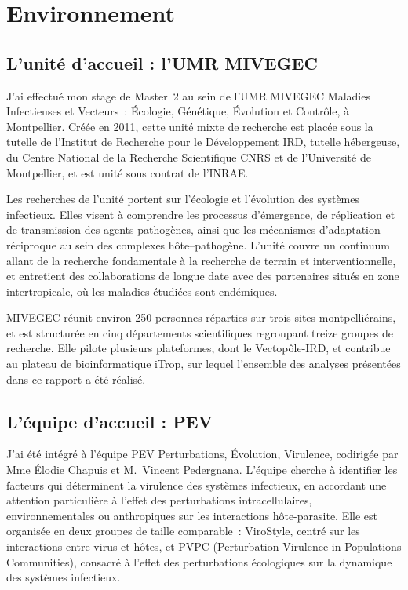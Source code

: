 \documentclass[11pt,a4paper]{article}
\begin{document}
\newpage
\tableofcontents

\newpage




\section{Environnement}

\subsection{L'unité d'accueil : l'UMR MIVEGEC}

J'ai effectué mon stage de Master~2 au sein de l'UMR MIVEGEC Maladies Infectieuses et
Vecteurs~: Écologie, Génétique, Évolution et Contrôle, à Montpellier. Créée en 2011, cette unité
mixte de recherche est placée sous la tutelle de l'Institut de Recherche pour le Développement
IRD, tutelle hébergeuse, du Centre National de la Recherche Scientifique CNRS et de
l'Université de Montpellier, et est unité sous contrat de l'INRAE.

Les recherches de l'unité portent sur l'écologie et l'évolution des systèmes infectieux. Elles
visent à comprendre les processus d'émergence, de réplication et de transmission des agents
pathogènes, ainsi que les mécanismes d'adaptation réciproque au sein des complexes hôte--pathogène.
L'unité couvre un continuum allant de la recherche fondamentale à la recherche de terrain et
interventionnelle, et entretient des collaborations de longue date avec des partenaires situés en
zone intertropicale, où les maladies étudiées sont endémiques.

MIVEGEC réunit environ 250 personnes réparties sur trois sites montpelliérains, et est structurée
en cinq départements scientifiques regroupant treize groupes de recherche. Elle pilote plusieurs
plateformes, dont le Vectopôle-IRD, et contribue au plateau de bioinformatique iTrop, sur lequel
l'ensemble des analyses présentées dans ce rapport a été réalisé.

\subsection{L'équipe d'accueil : PEV}

J'ai été intégré à l'équipe PEV Perturbations, Évolution, Virulence, codirigée par
Mme Élodie Chapuis et M.~Vincent Pedergnana. L'équipe cherche à identifier les facteurs qui
déterminent la virulence des systèmes infectieux, en accordant une attention particulière à l'effet
des perturbations intracellulaires, environnementales ou anthropiques sur les interactions
hôte-parasite. Elle est organisée en deux groupes de taille comparable~: ViroStyle, centré sur les
interactions entre virus et hôtes, et PVPC (Perturbation
Virulence in Populations Communities), consacré à l'effet des perturbations écologiques sur la
dynamique des systèmes infectieux.
\end{document}
